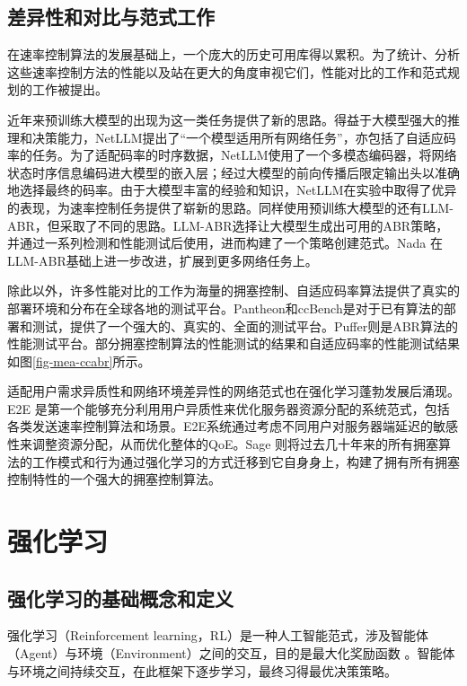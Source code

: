 \subsection{差异性和对比与范式工作}
在速率控制算法的发展基础上，一个庞大的历史可用库得以累积。为了统计、分析这些速率控制方法的性能以及站在更大的角度审视它们，性能对比的工作和范式规划的工作被提出。

近年来预训练大模型的出现为这一类任务提供了新的思路。得益于大模型强大的推理和决策能力，NetLLM\cite{wu2024netllm}提出了“一个模型适用所有网络任务”，亦包括了自适应码率的任务。为了适配码率的时序数据，NetLLM使用了一个多模态编码器，将网络状态时序信息编码进大模型的嵌入层；经过大模型的前向传播后限定输出头以准确地选择最终的码率。由于大模型丰富的经验和知识，NetLLM在实验中取得了优异的表现，为速率控制任务提供了崭新的思路。同样使用预训练大模型的还有LLM-ABR\cite{he2024llm}，但采取了不同的思路。LLM-ABR选择让大模型生成出可用的ABR策略，并通过一系列检测和性能测试后使用，进而构建了一个策略创建范式。Nada\cite{he2024designing} 在LLM-ABR基础上进一步改进，扩展到更多网络任务上。


除此以外，许多性能对比的工作为海量的拥塞控制、自适应码率算法提供了真实的部署环境和分布在全球各地的测试平台。Pantheon\cite{yan2018pantheon}和ccBench\cite{abbasloo2023internet}是对于已有算法的部署和测试，提供了一个强大的、真实的、全面的测试平台。Puffer\cite{yan2020learning}则是ABR算法的性能测试平台。部分拥塞控制算法的性能测试的结果和自适应码率的性能测试结果如图\ref{fig-mea-ccabr}所示。



适配用户需求异质性和网络环境差异性的网络范式也在强化学习蓬勃发展后涌现。E2E \cite{zhang2019e2e}是第一个能够充分利用用户异质性来优化服务器资源分配的系统范式，包括各类发送速率控制算法和场景。E2E系统通过考虑不同用户对服务器端延迟的敏感性来调整资源分配，从而优化整体的QoE。Sage\cite{yen2023computers} 则将过去几十年来的所有拥塞算法的工作模式和行为通过强化学习的方式迁移到它自身身上，构建了拥有所有拥塞控制特性的一个强大的拥塞控制算法。

\section{强化学习}
\subsection{强化学习的基础概念和定义}
强化学习（Reinforcement learning，RL）是一种人工智能范式，涉及智能体（Agent）与环境（Environment）之间的交互，目的是最大化奖励函数 \cite{mnih2015human}。智能体与环境之间持续交互，在此框架下逐步学习，最终习得最优决策策略。

